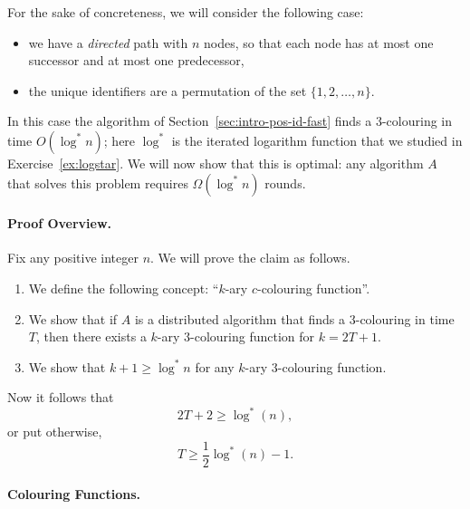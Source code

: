 For the sake of concreteness, we will consider the following case:
\begin{itemize}
    \item we have a \emph{directed} path with $n$ nodes, so that each node has at most one successor and at most one predecessor,
    \item the unique identifiers are a permutation of the set $\{1,2,\dotsc,n\}$.
\end{itemize}
In this case the algorithm of Section~\ref{sec:intro-pos-id-fast} finds a $3$-colouring in time $O(\log^* n)$; here $\log^*$ is the iterated logarithm function that we studied in Exercise~\ref{ex:logstar}. We will now show that this is optimal: any algorithm $A$ that solves this problem requires $\Omega(\log^* n)$ rounds.


\paragraph{Proof Overview.}

Fix any positive integer $n$. We will prove the claim as follows.
\begin{enumerate}
    \item We define the following concept: ``$k$-ary $c$-colouring function''.
    \item We show that if $A$ is a distributed algorithm that finds a $3$-colouring in time $T$, then there exists a $k$-ary $3$-colouring function for $k = 2T+1$.
    \item We show that $k + 1 \ge \log^* n$ for any $k$-ary $3$-colouring function.
\end{enumerate}
Now it follows that
\[
    2T + 2 \ge \log^*(n),
\]
or put otherwise,
\[
    T \ge \frac{1}{2}\log^*(n) - 1.
\]


\paragraph{Colouring Functions.}

